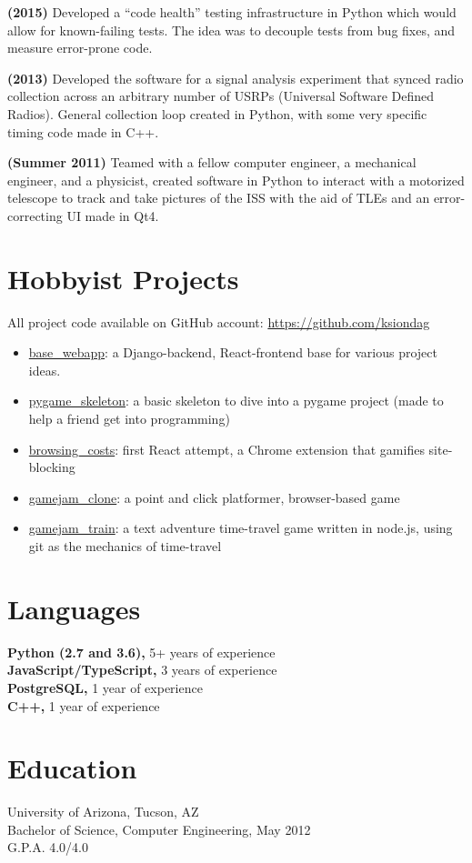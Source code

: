 \documentclass{res}
\begin{document}
\begin{resume}
  {\bf (2015) } Developed a ``code health'' testing infrastructure in Python which would allow for 
  known-failing tests. The idea was to decouple tests from bug fixes, and measure error-prone code.

  {\bf (2013) } Developed the software for a signal analysis experiment that synced radio collection across
  an arbitrary number of USRPs (Universal Software Defined Radios). General collection loop created in Python,
  with some very specific timing code made in C++.

  {\bf (Summer 2011) } Teamed with a fellow computer engineer, a mechanical engineer, and a
  physicist, created software in Python to interact with a motorized telescope to track
  and take pictures of the ISS with the aid of TLEs and an error-correcting UI made in Qt4.
\vspace{0.1in}
    
 
\section{Hobbyist Projects}
All project code available on GitHub account: \url{https://github.com/ksiondag}
  \begin{itemize}
    \item \href{https://github.com/ksiondag/base_webapp}{base\_webapp}: a Django-backend, React-frontend
    base for various project ideas.
    \item \href{https://github.com/ksiondag/pygame_skeleton}{pygame\_skeleton}: a basic skeleton to dive
    into a pygame project (made to help a friend get into programming)
    \item \href{https://github.com/ksiondag/browsing_costs}{browsing\_costs}: first React attempt, a
    Chrome extension that gamifies site-blocking
    \item \href{https://github.com/ksiondag/gamejam_clone}{gamejam\_clone}: a point and click platformer,
    browser-based game
    \item \href{https://github.com/ksiondag/gamejam_train}{gamejam\_train}: a text adventure time-travel
    game written in node.js, using git as the mechanics of time-travel
  \end{itemize}
\vspace{0.1in}

  
\section{Languages} 
\vspace{0.1in}
  {\bf Python (2.7 and 3.6),} 5+ years of experience\\
  {\bf JavaScript/TypeScript,} 3 years of experience\\
  {\bf PostgreSQL,} 1 year of experience\\
  {\bf C++,} 1 year of experience
  
\section{Education}
\vspace{0.1in} 
  University of Arizona, Tucson, AZ  \\        
  Bachelor of Science, Computer Engineering, May 2012   \\       
  G.P.A. 4.0/4.0          
    
 
\end{resume}
\end{document}
